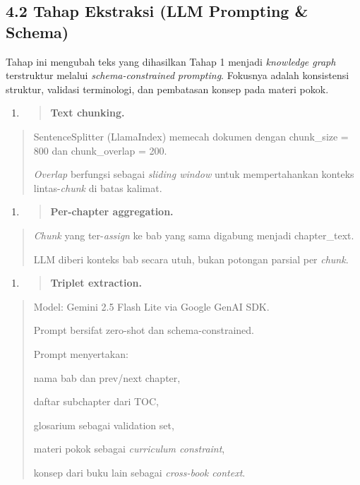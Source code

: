 \documentclass[
]{article}
\begin{document}
\hypertarget{tahap-ekstraksi-llm-prompting-schema}{%
\subsection{4.2 Tahap Ekstraksi (LLM Prompting \&
Schema)}\label{tahap-ekstraksi-llm-prompting-schema}}

Tahap ini mengubah teks yang dihasilkan Tahap 1 menjadi \emph{knowledge
graph} terstruktur melalui \emph{schema-constrained} \emph{prompting}.
Fokusnya adalah konsistensi struktur, validasi terminologi, dan
pembatasan konsep pada materi pokok.

\begin{enumerate}
\def\labelenumi{\arabic{enumi}.}
\item
  \begin{quote}
  \textbf{Text chunking.}
  \end{quote}
\end{enumerate}

\begin{quote}
SentenceSplitter (LlamaIndex) memecah dokumen dengan chunk\_size = 800
dan chunk\_overlap = 200.

\emph{Overlap} berfungsi sebagai \emph{sliding window} untuk
mempertahankan konteks lintas-\emph{chunk} di batas kalimat.
\end{quote}

\begin{enumerate}
\def\labelenumi{\arabic{enumi}.}
\setcounter{enumi}{1}
\item
  \begin{quote}
  \textbf{Per-chapter aggregation.}
  \end{quote}
\end{enumerate}

\begin{quote}
\emph{Chunk} yang ter-\emph{assign} ke bab yang sama digabung menjadi
chapter\_text.

LLM diberi konteks bab secara utuh, bukan potongan parsial per
\emph{chunk}.
\end{quote}

\begin{enumerate}
\def\labelenumi{\arabic{enumi}.}
\setcounter{enumi}{2}
\item
  \begin{quote}
  \textbf{Triplet extraction.}
  \end{quote}
\end{enumerate}

\begin{quote}
Model: Gemini 2.5 Flash Lite via Google GenAI SDK.

Prompt bersifat zero-shot dan schema-constrained.

Prompt menyertakan:

nama bab dan prev/next chapter,

daftar subchapter dari TOC,

glosarium sebagai validation set,

materi pokok sebagai \emph{curriculum constraint},

konsep dari buku lain sebagai \emph{cross-book context}.
\end{quote}
\end{document}
